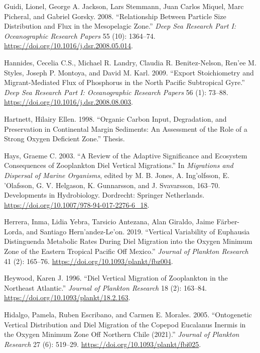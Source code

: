 \documentclass[]{article}
\begin{document}
\leavevmode\hypertarget{ref-guidiRelationshipParticleSize2008}{}%
Guidi, Lionel, George A. Jackson, Lars Stemmann, Juan Carlos Miquel,
Marc Picheral, and Gabriel Gorsky. 2008. ``Relationship Between Particle
Size Distribution and Flux in the Mesopelagic Zone.'' \emph{Deep Sea
Research Part I: Oceanographic Research Papers} 55 (10): 1364--74.
\url{https://doi.org/10.1016/j.dsr.2008.05.014}.

\leavevmode\hypertarget{ref-hannidesExportStoichiometryMigrantmediated2009}{}%
Hannides, Cecelia C.S., Michael R. Landry, Claudia R. Benitez-Nelson,
Ren\a'ee M. Styles, Joseph P. Montoya, and David M. Karl. 2009. ``Export
Stoichiometry and Migrant-Mediated Flux of Phosphorus in the North
Pacific Subtropical Gyre.'' \emph{Deep Sea Research Part I:
Oceanographic Research Papers} 56 (1): 73--88.
\url{https://doi.org/10.1016/j.dsr.2008.08.003}.

\leavevmode\hypertarget{ref-hartnettOrganicCarbonInput1998}{}%
Hartnett, Hilairy Ellen. 1998. ``Organic Carbon Input, Degradation, and
Preservation in Continental Margin Sediments: An Assessment of the Role
of a Strong Oxygen Deficient Zone.'' Thesis.

\leavevmode\hypertarget{ref-haysReviewAdaptiveSignificance2003}{}%
Hays, Graeme C. 2003. ``A Review of the Adaptive Significance and
Ecosystem Consequences of Zooplankton Diel Vertical Migrations.'' In
\emph{Migrations and Dispersal of Marine Organisms}, edited by M. B.
Jones, A. Ing\a'olfsson, E. \a'Olafsson, G. V. Helgason, K. Gunnarsson,
and J. Svavarsson, 163--70. Developments in Hydrobiology. Dordrecht:
Springer Netherlands.
\url{https://doi.org/10.1007/978-94-017-2276-6_18}.

\leavevmode\hypertarget{ref-herreraVerticalVariabilityEuphausia2019}{}%
Herrera, Inma, Lidia Yebra, Tarsicio Antezana, Alan Giraldo, Jaime
Färber-Lorda, and Santiago Hern\a'andez-Le\a'on. 2019. ``Vertical
Variability of Euphausia Distinguenda Metabolic Rates During Diel
Migration into the Oxygen Minimum Zone of the Eastern Tropical Pacific
Off Mexico.'' \emph{Journal of Plankton Research} 41 (2): 165--76.
\url{https://doi.org/10.1093/plankt/fbz004}.

\leavevmode\hypertarget{ref-heywoodDielVerticalMigration1996}{}%
Heywood, Karen J. 1996. ``Diel Vertical Migration of Zooplankton in the
Northeast Atlantic.'' \emph{Journal of Plankton Research} 18 (2):
163--84. \url{https://doi.org/10.1093/plankt/18.2.163}.

\leavevmode\hypertarget{ref-hidalgoOntogeneticVerticalDistribution2005}{}%
Hidalgo, Pamela, Ruben Escribano, and Carmen E. Morales. 2005.
``Ontogenetic Vertical Distribution and Diel Migration of the Copepod
Eucalanus Inermis in the Oxygen Minimum Zone Off Northern Chile
(2021).'' \emph{Journal of Plankton Research} 27 (6): 519--29.
\url{https://doi.org/10.1093/plankt/fbi025}.
\end{document}
